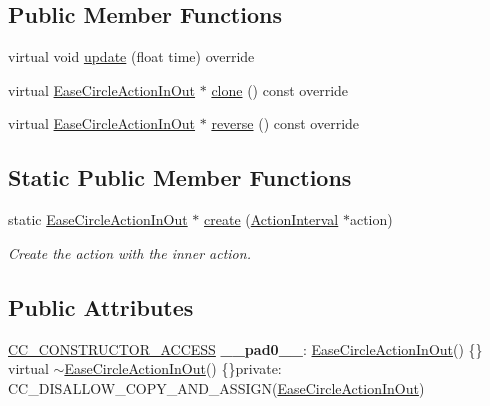 \subsection*{Public Member Functions}
\begin{DoxyCompactItemize}
\item 
virtual void \hyperlink{classEaseCircleActionInOut_a6a9cb49f30bc664ab65a067ce48b506e}{update} (float time) override
\item 
virtual \hyperlink{classEaseCircleActionInOut}{Ease\+Circle\+Action\+In\+Out} $\ast$ \hyperlink{classEaseCircleActionInOut_a552bd0eca0772b24c6ff2624072f65c3}{clone} () const override
\item 
virtual \hyperlink{classEaseCircleActionInOut}{Ease\+Circle\+Action\+In\+Out} $\ast$ \hyperlink{classEaseCircleActionInOut_ab661d01e3d2ddf781948ae6c42a52cb9}{reverse} () const override
\end{DoxyCompactItemize}
\subsection*{Static Public Member Functions}
\begin{DoxyCompactItemize}
\item 
static \hyperlink{classEaseCircleActionInOut}{Ease\+Circle\+Action\+In\+Out} $\ast$ \hyperlink{classEaseCircleActionInOut_a518d811f85a139e0ce8456d1af8ede44}{create} (\hyperlink{classActionInterval}{Action\+Interval} $\ast$action)
\begin{DoxyCompactList}\small\item\em Create the action with the inner action. \end{DoxyCompactList}\end{DoxyCompactItemize}
\subsection*{Public Attributes}
\begin{DoxyCompactItemize}
\item 
\mbox{\label{classEaseCircleActionInOut_ae1a99cc29c63492dedfec98aaeff832f}} 
\hyperlink{_2cocos2d_2cocos_2base_2ccConfig_8h_a25ef1314f97c35a2ed3d029b0ead6da0}{C\+C\+\_\+\+C\+O\+N\+S\+T\+R\+U\+C\+T\+O\+R\+\_\+\+A\+C\+C\+E\+SS} {\bfseries \+\_\+\+\_\+pad0\+\_\+\+\_\+}\+: \hyperlink{classEaseCircleActionInOut}{Ease\+Circle\+Action\+In\+Out}() \{\} virtual $\sim$\hyperlink{classEaseCircleActionInOut}{Ease\+Circle\+Action\+In\+Out}() \{\}private\+: C\+C\+\_\+\+D\+I\+S\+A\+L\+L\+O\+W\+\_\+\+C\+O\+P\+Y\+\_\+\+A\+N\+D\+\_\+\+A\+S\+S\+I\+GN(\hyperlink{classEaseCircleActionInOut}{Ease\+Circle\+Action\+In\+Out})
\end{DoxyCompactItemize}
